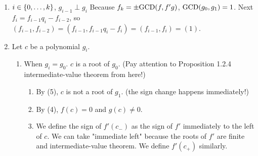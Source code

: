 \documentclass[9pt]{ltjsarticle}
\begin{document}
\begin{itemize}
\begin{enumerate}
\begin{enumerate}
\begin{align}
        \end{align}
        (by (b), $C_\bullet -1 \ge 0$)
        \item
        By the definition of GCD ($H|H_1$ and $H|H_2$), the roots of $H$ is a root of $H_1$ and $H_2$.
        \item
        If $\xi$ is not a root of $H_1$ or not a root of $H_2$ then
        $\xi$ is not a root of $H$.
        \item
        By (c), $b_\bullet$ are not roots of $H_1$.
        \item
        By (b) and (c), $a_\bullet$ are not roots of $H_2$.
        \item
        (g,h,i) implies $a_\bullet,b_\bullet$ are not roots of $H$.
        \item
        By (e, j),
        \begin{align}
          \frac{f}{\GCD(f,f'g)} = (x-a_1)\dots (x-a_l) \ub{\frac{F(x)}{H(x)}}_{\in R[x]}.
        \end{align}
        because $f/\GCD(f,f'g) \in R[x]$.  By (b), $\frac{F}{H}$ have no root at $a_\bullet$.
        \item
        By definition of $g_0$, $g_0 = \pm f/\GCD(f,f'g)$.
        $a_\bullet$ were the roots of $f$ which are not roots of $g$.
      \end{enumerate}
      \item
      $i\in \left\{0,\dots,k\right\}$, $g_{i-1} \perp g_i$ \pf
      Because $f_k = \pm {\rm GCD}(f,f'g)$, ${\rm GCD}(g_0,g_1)=1$.
      Next $f_i = f_{i-1}q_i - f_{i-2}$, so
      $(f_{i-1},f_{i-2}) = (f_{i-1}, f_{i-1}q_i - f_i) = (f_{i-1},f_i) = (1)$.
      \item
      Let $c$ be a polynomial $g_i$.
      \begin{enumerate}
        \item When $g_i = g_0$. $c$ is a root of $g_0$.
        (Pay attention to Proposition 1.2.4 intermediate-value theorem from here!)
        \begin{enumerate}
          \item By (5), $c$ is not a root of $g_1$.
          (the sign change happens immediately!)
          \item
          By (4), $f(c)=0$ and $g(c)\neq 0$.
          \item
          We define the sign of $f'(c_-)$ as the sign of $f'$ immediately to the left of $c$.
          We can take "immediate left" because
          the roots of $f'$ are finite and intermediate-value theorem.
          We define $f'(c_+)$ similarly.

\end{enumerate}
\end{enumerate}
\end{enumerate}
\end{itemize}
\end{document}
